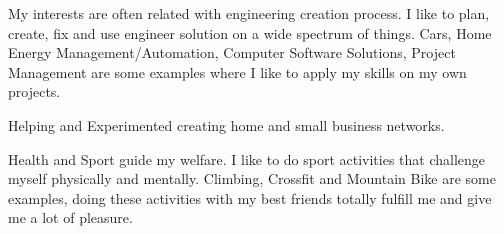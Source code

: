 \begin{cventries}
  \cventry
    {}
    {}
    {}
    {}
    {
  \vspace{-5 mm}
 \begin{cvitems}
        \item {My interests are often related with engineering creation process. I like to plan, create, fix and use engineer solution on a wide spectrum of things. Cars, Home Energy Management/Automation, Computer Software Solutions, Project Management are some examples where I like to apply my skills on my own projects.}
        \item {Helping and Experimented creating home and small business networks.}
\item {Health and Sport guide my welfare. I like to do sport activities that challenge myself physically and mentally. Climbing, Crossfit and Mountain Bike are some examples, doing these activities with my best friends totally fulfill me and give me a lot of pleasure.}
      \end{cvitems}
    }
\end{cventries}
